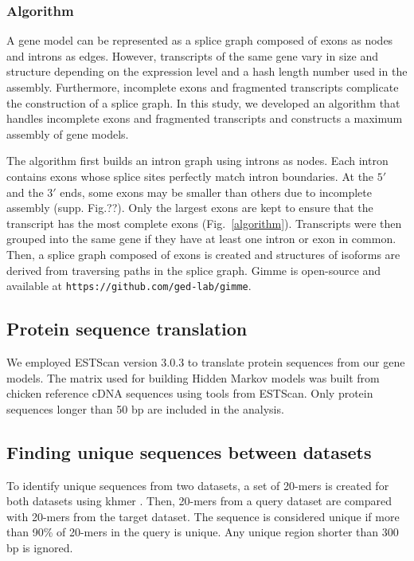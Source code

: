 \documentclass[10pt]{article}
\begin{document}
\subsubsection*{Algorithm}

A gene model can be represented as a splice graph composed of exons as nodes and
introns as edges.  However, transcripts of the same gene vary in size and
structure depending on the expression level and a hash length number used in
the assembly.  Furthermore, incomplete exons and fragmented transcripts complicate
the construction of a splice graph.  In this study, we developed an algorithm
that handles incomplete exons and fragmented transcripts and constructs a
maximum assembly of gene models.

The algorithm first builds an intron graph using introns as nodes.  Each intron
contains exons whose splice sites perfectly match intron boundaries. At the
$5\prime$ and the $3\prime$ ends, some exons may be smaller than others due to
incomplete assembly (supp. Fig.??). Only the largest exons are kept to ensure
that the transcript has the most complete exons (Fig.~\ref{algorithm}).
Transcripts were then grouped into the same gene if they have at least one
intron or exon in common.  Then, a splice graph composed of exons is created
and structures of isoforms are derived from traversing paths in the splice
graph.  Gimme is open-source and available at
\texttt{https://github.com/ged-lab/gimme}.

\subsection*{Protein sequence translation}

We employed ESTScan version 3.0.3 to translate protein sequences from our gene
models.  The matrix used for building Hidden Markov models was built from chicken
reference cDNA sequences using tools from ESTScan. Only protein sequences longer
than 50 bp are included in the analysis.

\subsection*{Finding unique sequences between datasets}

To identify unique sequences from two datasets, a set of 20-mers is created for
both datasets using khmer\cite{} . Then, 20-mers from a query dataset are
compared with 20-mers from the target dataset.  The sequence is considered
unique if more than 90\% of 20-mers in the query is unique.  Any unique region
shorter than 300 bp is ignored.
\end{document}

